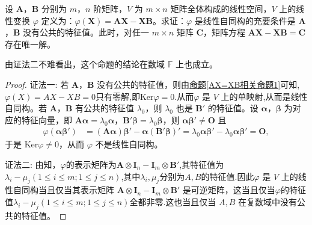 \documentclass[../../main.tex]{subfiles}
\begin{document}
\begin{proposition}\label{proposition:AX-XB相关命题1}
设 \(\boldsymbol{A}\)，\(\boldsymbol{B}\) 分别为 \(m\)，\(n\) 阶矩阵，\(V\) 为 \(m\times n\) 矩阵全体构成的线性空间，\(V\) 上的线性变换 \(\varphi\) 定义为：\(\varphi(\boldsymbol{X}) = \boldsymbol{AX - XB}\)。求证：\(\varphi\) 是线性自同构的充要条件是 \(\boldsymbol{A}\)，\(\boldsymbol{B}\) 没有公共的特征值。此时，对任一 \(m\times n\) 矩阵 \(\boldsymbol{C}\)，矩阵方程 \(\boldsymbol{AX - XB = C}\) 存在唯一解。
\end{proposition}
\begin{remark}
由{\color{blue}证法二}不难看出，这个命题的结论在数域 $\mathbb{F}$ 上也成立。
\end{remark}
\begin{proof}
{\color{blue}证法一:}
若 \(\boldsymbol{A}\)，\(\boldsymbol{B}\) 没有公共的特征值，则由\hyperref[AX=XB相关命题1]{命题\ref{AX=XB相关命题1}}可知,$\varphi(X)=AX-XB=0$只有零解,即$\mathrm{Ker}\varphi= 0$.从而\(\varphi\) 是 \(V\) 上的单映射,从而是线性自同构。若 \(\boldsymbol{A}\)，\(\boldsymbol{B}\) 有公共的特征值 \(\lambda_0\)，则 \(\lambda_0\) 也是 \(\boldsymbol{B}'\) 的特征值。设 \(\boldsymbol{\alpha}\)，\(\boldsymbol{\beta}\) 为对应的特征向量，即 \(\boldsymbol{A\alpha}=\lambda_0\boldsymbol{\alpha}\)，\(\boldsymbol{B}'\boldsymbol{\beta}=\lambda_0\boldsymbol{\beta}\)，则 \(\boldsymbol{\alpha\beta}'\neq\boldsymbol{O}\) 且
\begin{align*}
\varphi(\boldsymbol{\alpha\beta}')&=(\boldsymbol{A\alpha})\boldsymbol{\beta}' - \boldsymbol{\alpha}(\boldsymbol{B}'\boldsymbol{\beta})'=\lambda_0\boldsymbol{\alpha\beta}' - \lambda_0\boldsymbol{\alpha\beta}'=\boldsymbol{O},
\end{align*}
于是 \(\mathrm{Ker}\varphi\neq 0\)，从而 \(\varphi\) 不是线性自同构。

{\color{blue}证法二:}
由知，$\varphi$的表示矩阵为$\boldsymbol{A} \otimes \boldsymbol{I}_n - \boldsymbol{I}_m \otimes \boldsymbol{B}'$,其特征值为$\lambda_i - \mu_j (1 \leq i \leq m; 1 \leq j \leq n)$,其中$\lambda_i,\mu_j$分别为$A,B$的特征值.因此$\varphi$ 是 $V$ 上的线性自同构当且仅当其表示矩阵 $\boldsymbol{A} \otimes \boldsymbol{I}_n - \boldsymbol{I}_m \otimes \boldsymbol{B}'$ 是可逆矩阵，这当且仅当$\varphi$的特征值$\lambda_i - \mu_j (1 \leq i \leq m; 1 \leq j \leq n)$全都非零.这也当且仅当 $A,B$ 在复数域中没有公共的特征值。
\end{proof}
\end{document}
